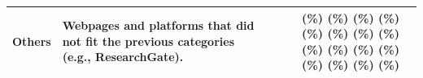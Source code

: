 \documentclass{article}
\newlength\BARSIZE  \setlength\BARSIZE{0.9cm}
\newcommand*\ChartWithAbsoluteAndPercentageNumbers[2]{
    \numprint{#1}&\ShowPercentageNoHundred{#1}{#2}&\inlinechart{#1}{#2}}
\newcommand{\inlinechart}[2]{%
\FPeval{\BLACKBARSIZE}{#1/#2}\textcolor{black!80}{\rule{\BLACKBARSIZE\BARSIZE}{1.6ex}}%
\FPeval{\BLACKBARSIZE}{1 - (#1/#2)}\textcolor{black!10}{\rule{\BLACKBARSIZE\BARSIZE}{1.6ex}}%
}
\newcommand{\ShowPercentageNoHundred}[2]{%
    \FPeval\percentage{round(#1/#2*100,1)}%
    \FPeval\percentageRounded{round(#1/#2*100,0)}%
    \ifthenelse
        {\equal{\percentageRounded}{0}}%
        {(\hspace*{4.3pt}\FPprint{percentage}\%)}%
        {%
        \ifthenelse
            {\equal{\percentageRounded}{1}}%
            {(\hspace*{4.3pt}\FPprint{percentage}\%)}%
            {%
            \ifthenelse
                {\equal{\percentageRounded}{2}}%
                {(\hspace*{4.3pt}\FPprint{percentage}\%)}%
                {%
                \ifthenelse
                    {\equal{\percentageRounded}{3}}%
                    {(\hspace*{4.3pt}\FPprint{percentage}\%)}%
                    {%
                    \ifthenelse
                        {\equal{\percentageRounded}{4}}%
                        {(\hspace*{4.3pt}\FPprint{percentage}\%)}%
                        {%
                        \ifthenelse
                            {\equal{\percentageRounded}{5}}%
                            {(\hspace*{4.3pt}\FPprint{percentage}\%)}%
                            {%
                            \ifthenelse
                                {\equal{\percentageRounded}{6}}%
                                {(\hspace*{4.3pt}\FPprint{percentage}\%)}%
                                {%
                                \ifthenelse
                                    {\equal{\percentageRounded}{7}}%
                                    {(\hspace*{4.3pt}\FPprint{percentage}\%)}%
                                    {%
                                    \ifthenelse
                                        {\equal{\percentageRounded}{8}}%
                                        {(\hspace*{4.3pt}\FPprint{percentage}\%)}%
                                        {%
                                        \ifthenelse
                                            {\equal{\percentageRounded}{9}}%
                                            {(\hspace*{4.3pt}\FPprint{percentage}\%)}%
                                            {%
                                            \ifthenelse
                                                {\equal{\percentage}{9.5}}%
                                                {(\hspace*{4.3pt}\FPprint{percentage}\%)}%
                                                {%
                                                \ifthenelse
                                                    {\equal{\percentage}{9.6}}%
                                                    {(\hspace*{4.3pt}\FPprint{percentage}\%)}%
                                                    {%
                                                    \ifthenelse
                                                        {\equal{\percentage}{9.7}}%
                                                        {(\hspace*{4.3pt}\FPprint{percentage}\%)}%
                                                        {%
                                                        \ifthenelse
                                                            {\equal{\percentage}{9.8}}%
                                                            {(\hspace*{4.3pt}\FPprint{percentage}\%)}%
                                                            {%
                                                            \ifthenelse
                                                                {\equal{\percentage}{9.9}}%
                                                                {(\hspace*{4.3pt}\FPprint{percentage}\%)}%
                                                                {%
                                                                    (\FPprint{percentage}\%)
                                                                }%
                                                            }%
                                                        }%
                                                    }%
                                                }%
                                            }%
                                        }%
                                    }%
                                }%
                            }%
                        }%
                    }%
                }%
            }%
        }%
}%
\begin{document}
\begin{table}[htbp]
\begin{threeparttable}
\begin{tabular}{@{}p{18mm} m{85mm} @{\hskip 0.1in} r @{\hskip 0.03in} r @{\hskip 0.02in} l@{}}
\midrule
        Others &
        Webpages and platforms that did not fit the previous categories (e.g., ResearchGate). &
            \ChartWithAbsoluteAndPercentageNumbers{\varOtherRepsICSEFSE}{\varTotalOfLinksICSEFSE}\\
   
        \bottomrule
   
    \end{tabular}
    \end{threeparttable}

\end{table}
\end{document}
